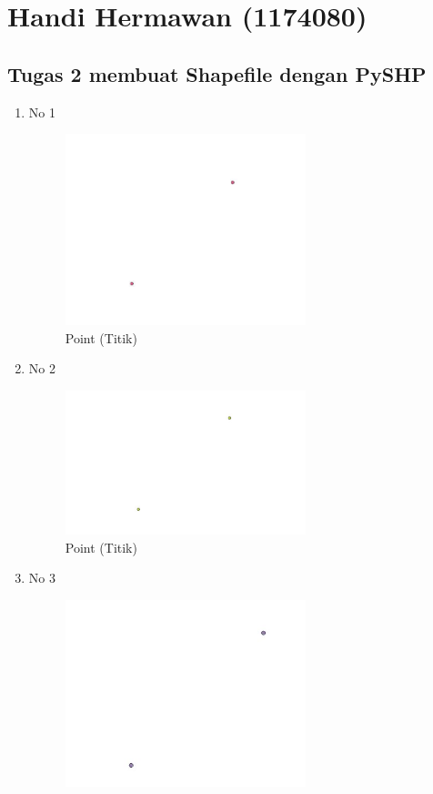\section{Handi Hermawan (1174080)}
\subsection{Tugas 2 membuat Shapefile dengan PySHP}
\begin{enumerate}
	\item No 1
	
	\begin{figure}[H]
		\includegraphics[width=7cm]{figures/Tugas2/1174080/no1.JPG}
		\centering
		\caption{Point (Titik)}
	\end{figure}
	\item No 2
	
	\begin{figure}[H]
		\includegraphics[width=7cm]{figures/Tugas2/1174080/no2.JPG}
		\centering
		\caption{Point (Titik)}
	\end{figure}
	\item No 3
	
	\begin{figure}[H]
		\includegraphics[width=7cm]{figures/Tugas2/1174080/no3.JPG}

\end{figure}
\end{enumerate}
